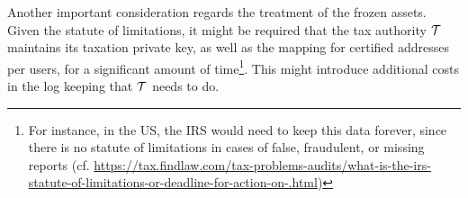 Another important consideration regards the treatment of the frozen assets.
Given the statute of limitations, it might be required that the tax authority
$\mathcal{T}$ maintains its taxation private key, as well as the mapping for
certified addresses per users, for a significant amount of time\footnote{For
instance, in the US, the IRS would need to keep this data forever, since there
is no statute of limitations in cases of false, fraudulent, or missing reports
(cf.
\url{https://tax.findlaw.com/tax-problems-audits/what-is-the-irs-statute-of-limitations-or-deadline-for-action-on-.html})}.
This might introduce additional costs in the log keeping that $\mathcal{T}$ needs
to do.
